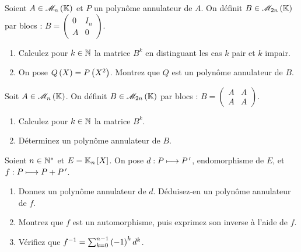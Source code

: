 \begin{exopss}[Exercice 29]
Soient \(A\in\M{n}\) et \(P\) un polynôme annulateur de \(A\). On définit \(B\in\M{2n}\) par blocs : \(B=\begin{pmatrix}
0 & I_n \\
A & 0
\end{pmatrix}\).

\begin{enumerate}
    \item Calculez pour \(k\in\mathbb{N}\) la matrice \(B^k\) en distinguant les cas \(k\) pair et \(k\) impair. \\
    \item On pose \(Q\left(X\right)=P\left(X^2\right)\). Montrez que \(Q\) est un polynôme annulateur de \(B\).
\end{enumerate}
\end{exopss}



\begin{exopss}[Exercice 30]
Soit \(A\in\M{n}\). On définit \(B\in\M{2n}\) par blocs : \(B=\begin{pmatrix}
A & A \\
A & A
\end{pmatrix}\).

\begin{enumerate}
    \item Calculez pour \(k\in\mathbb{N}\) la matrice \(B^k\). \\
    \item Déterminez un polynôme annulateur de \(B\).
\end{enumerate}
\end{exopss}



\begin{exopss}[Exercice 31]
Soient \(n\in\mathbb{N}^*\) et \(E=\polydeg{n}\). On pose \(d:P\longmapsto P^{\,\prime}\), endomorphisme de \(E\), et \(f:P\longmapsto P+P^{\,\prime}\).

\begin{enumerate}
    \item Donnez un polynôme annulateur de \(d\). Déduisez-en un polynôme annulateur de \(f\). \\
    \item Montrez que \(f\) est un automorphisme, puis exprimez son inverse à l'aide de \(f\). \\
    \item Vérifiez que \(f^{-1}=\sum_{k=0}^{n-1}\left(-1\right)^kd^k\).
\end{enumerate}
\end{exopss}



